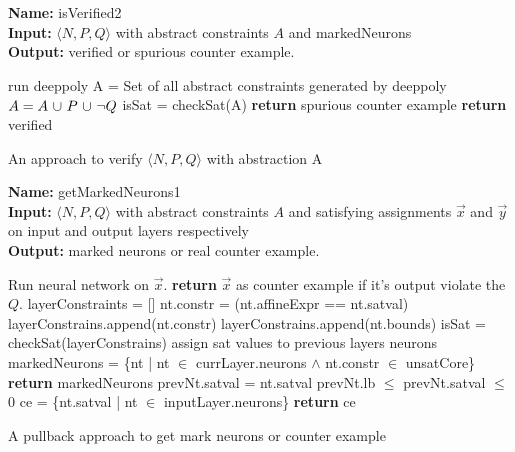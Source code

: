 \begin{algorithm}[t]
  \textbf{Name: } isVerified2 \\
  \textbf{Input: } $\langle N,P,Q \rangle$ with abstract constraints $A$ and markedNeurons \\
  \textbf{Output: } verified or spurious counter example. 
  \begin{algorithmic}[1]
      \State run deeppoly
        \State A = Set of all abstract constraints generated by deeppoly
        \State $A = A ~ {\cup} ~ P ~ {\cup} ~ \neg Q$ 
        \State isSat = checkSat(A)
          \State \textbf{return} spurious counter example
        \EndIf
      \EndIf
    \EndFor
    \State \textbf{return} verified
  \end{algorithmic}
  \caption{An approach to verify $\langle N,P,Q \rangle$ with abstraction A}
  \label{algo:verif2}
\end{algorithm}



\begin{algorithm}[t]
  \textbf{Name: } getMarkedNeurons1 \\
  \textbf{Input: } $\langle N,P,Q \rangle$ with abstract constraints $A$ and satisfying assignments $\overrightarrow{x}$ and $\overrightarrow{y}$ on input and output layers respectively\\
  \textbf{Output: } marked neurons or real counter example. 
  \begin{algorithmic}[1]
   \State Run neural network on $\overrightarrow{x}$.
   \State \textbf{return} $\overrightarrow{x}$ as counter example if it's output violate the $Q$. 
        \State layerConstraints = []
          \State nt.constr = (nt.affineExpr == nt.satval)
          \State layerConstrains.append(nt.constr)
        \EndFor
          \State layerConstrains.append(nt.bounds)
        \EndFor
        \State isSat = checkSat(layerConstrains)
          \State assign sat values to previous layers neurons
        \Else
          \State markedNeurons = \{nt | nt $\in$ currLayer.neurons $\land$ nt.constr $\in$ unsatCore\}
          \State \textbf{return } markedNeurons
        \EndIf
      \Else {}
            \State prevNt.satval = nt.satval  
          \Else
            \State prevNt.lb $\leq$ prevNt.satval $\leq$ 0 
          \EndIf
        \EndFor
      \EndIf
   \EndFor
    \State ce = \{nt.satval | nt $\in$ inputLayer.neurons\} 
    \State \textbf{return} ce
  \end{algorithmic}
  \caption{A pullback approach to get mark neurons or counter example}
  \label{algo:refine1}
\end{algorithm}


